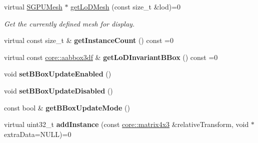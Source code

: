 \begin{DoxyCompactItemize}
virtual \hyperlink{classirr_1_1scene_1_1SGPUMesh}{S\+G\+P\+U\+Mesh} $\ast$ \hyperlink{classirr_1_1scene_1_1IMeshSceneNodeInstanced_ae9fa5c16448503254bd5a3810f8805ed}{get\+Lo\+D\+Mesh} (const size\+\_\+t \&lod)=0
\begin{DoxyCompactList}\small\item\em Get the currently defined mesh for display. \end{DoxyCompactList}\item 
virtual const size\+\_\+t \& {\bfseries get\+Instance\+Count} () const  =0\hypertarget{classirr_1_1scene_1_1IMeshSceneNodeInstanced_a93df569413230da297250022bac235d3}{}\label{classirr_1_1scene_1_1IMeshSceneNodeInstanced_a93df569413230da297250022bac235d3}

\item 
virtual const \hyperlink{namespaceirr_1_1core_adfc8fa01b30044c55f3332a1d6c1aa19}{core\+::aabbox3df} \& {\bfseries get\+Lo\+D\+Invariant\+B\+Box} () const  =0\hypertarget{classirr_1_1scene_1_1IMeshSceneNodeInstanced_a35f7e5e97be0667bc2336e2f1d3e90e5}{}\label{classirr_1_1scene_1_1IMeshSceneNodeInstanced_a35f7e5e97be0667bc2336e2f1d3e90e5}

\item 
void {\bfseries set\+B\+Box\+Update\+Enabled} ()\hypertarget{classirr_1_1scene_1_1IMeshSceneNodeInstanced_abb61c6cf5413d0c1d90617636a3a96b1}{}\label{classirr_1_1scene_1_1IMeshSceneNodeInstanced_abb61c6cf5413d0c1d90617636a3a96b1}

\item 
void {\bfseries set\+B\+Box\+Update\+Disabled} ()\hypertarget{classirr_1_1scene_1_1IMeshSceneNodeInstanced_a77fc012efe2c1c83d13d0a456737a4f8}{}\label{classirr_1_1scene_1_1IMeshSceneNodeInstanced_a77fc012efe2c1c83d13d0a456737a4f8}

\item 
const bool \& {\bfseries get\+B\+Box\+Update\+Mode} ()\hypertarget{classirr_1_1scene_1_1IMeshSceneNodeInstanced_a1738c7d291de6e1c43529752b1393103}{}\label{classirr_1_1scene_1_1IMeshSceneNodeInstanced_a1738c7d291de6e1c43529752b1393103}

\item 
virtual uint32\+\_\+t {\bfseries add\+Instance} (const \hyperlink{classirr_1_1core_1_1matrix4x3}{core\+::matrix4x3} \&relative\+Transform, void $\ast$extra\+Data=N\+U\+LL)=0\hypertarget{classirr_1_1scene_1_1IMeshSceneNodeInstanced_a25c2717ac8e82232946dac253465630e}{}\label{classirr_1_1scene_1_1IMeshSceneNodeInstanced_a25c2717ac8e82232946dac253465630e}


\end{DoxyCompactItemize}
